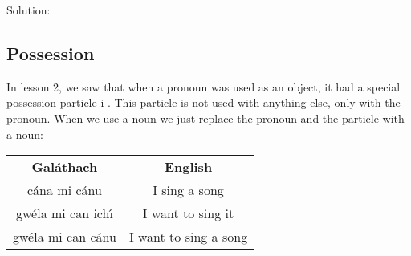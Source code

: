 \newpage
Solution:\\
\begin{table}[H]
\centering
{}
\label{solution_no_indefinite_article}
\caption{Solution: no indefinite article}
\end{table}
\newpage

\subsection{Possession}
In lesson 2, we saw that when a pronoun was used as an object, it had a special possession particle i-. This particle is not used with anything else, only with the pronoun. When we use a noun we just replace the pronoun and the particle with a noun:
\begin{table}[H]
\centering
\begin{tabular}{cc}
  \toprule
  \textbf{Gal\'{a}thach} & \textbf{English}\\
  \cmidrule(lr){1-1}\cmidrule(lr){2-2}
  c\'{a}na mi c\'{a}nu & I sing a song\\
  gw\'{e}la mi can ich\'{\i} & I want to sing it\\
  gw\'{e}la mi can c\'{a}nu & I want to sing a song\\
  \bottomrule
\end{tabular}
\label{examples_possession_particle_when_using_noun}
\end{table}

